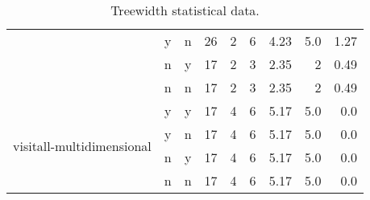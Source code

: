 \begin{table*}
\begin{tabular}{l|cc|rrrrrr}
			&	y	&	n	&	26	&	2	&	6	&	4.23	&	5.0	&	1.27\\
			&	n	&	y	&	17	&	2	&	3	&	2.35	&	2	&	0.49\\
			&	n	&	n	&	17	&	2	&	3	&	2.35	&	2	&	0.49\\
		\midrule
		\multirow{4}{*}{visitall-multidimensional}	&	y	&	y	&	17	&	4	&	6	&	5.17	&	5.0	&	0.0\\
			&	y	&	n	&	17	&	4	&	6	&	5.17	&	5.0	&	0.0\\
			&	n	&	y	&	17	&	4	&	6	&	5.17	&	5.0	&	0.0\\
			&	n	&	n	&	17	&	4	&	6	&	5.17	&	5.0	&	0.0\\
		\bottomrule
	\end{tabular}
	\caption{Treewidth statistical data.}
	\label{table:treewidths}
\end{table*}
